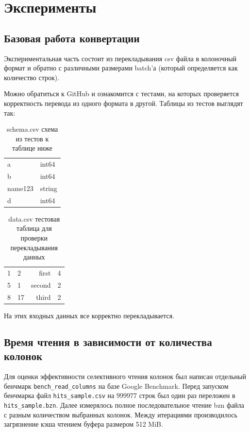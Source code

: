 \documentclass[a4paper,12pt]{extarticle}
\begin{document}
\section{Эксперименты}
\subsection{Базовая работа конвертации}

Экспериментальная часть состоит из перекладывания csv файла в колоночный формат и
обратно с различными размерами batch’а (который определяется как количество строк).

Можно обратиться к GitHub \cite{GitHub} и ознакомится с тестами, на которых 
проверяется корректность перевода из одного формата в другой. Таблицы из тестов 
выглядят так:

\begin{table}[ht]
	\caption{schema.csv схема из тестов к таблице ниже}
	\label{table:schema_csv}
	\footnotesize
	\centering
	\begin{tabular}{ll}
		a       & int64  \\
		b       & int64  \\
		name123 & string \\
		d       & int64
	\end{tabular}
\end{table}

\begin{table}[ht]
	\caption{data.csv тестовая таблица для проверки перекладывания данных }
	\label{table:data_csv}
	\footnotesize
	\centering
	\begin{tabular}{llrl}
		1 & 2  & first  & 4 \\
		5 & 1  & second & 2 \\
		8 & 17 & third  & 2
	\end{tabular}
\end{table}

На этих входных данных все корректно перекладывается.



\subsection{Время чтения в зависимости от количества колонок}

Для оценки эффективности селективного чтения колонок был написан отдельный
бенчмарк \texttt{bench\_read\_columns} на базе Google Benchmark. Перед запуском
бенчмарка файл \texttt{hits\_sample.csv} на $999977$ строк был один раз
переложен в \texttt{hits\_sample.bzn}. Далее измерялось полное последовательное
чтение bzn файла с разным количеством выбранных колонок. Между итерациями
производилось загрязнение кэша чтением буфера размером 512 MiB.
\end{document}
